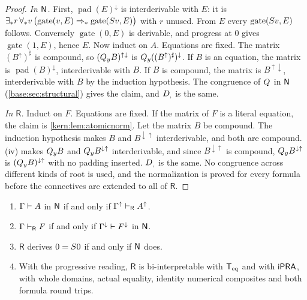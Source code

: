 \begin{proof}
\emph{In $\mathsf{N}$.}  First, $\operatorname{pad}(E)^{\downarrow}$ is
interderivable with $E$: it is
$\exists_* r\,\forall_* v\,\bigl(\operatorname{gate}(v,E)\Rightarrow_*
\operatorname{gate}(S v,E)\bigr)$ with $r$ unused.  From $E$ every
$\operatorname{gate}(S v,E)$ follows.  Conversely
$\operatorname{gate}(0,E)$ is derivable, and progress at $0$ gives
$\operatorname{gate}(1,E)$, hence $E$.  Now induct on $A$.  Equations are
fixed.  The matrix $(B^{\uparrow})^{\sharp}$ is compound, so
$(Q_{y}B)^{\uparrow\downarrow}$ is $Q_{y}((B^{\uparrow})^{\sharp})^{\downarrow}$.
If $B$ is an equation, the matrix is $\operatorname{pad}(B)^{\downarrow}$,
interderivable with $B$.  If $B$ is compound, the matrix is
$B^{\uparrow\downarrow}$, interderivable with $B$ by the induction
hypothesis.  The congruence of $Q_{}$ in $\mathsf{N}$
(\cref{base:sec:structural}) gives the claim, and $D_{,}$ is the same.

\emph{In $\mathsf{R}$.}  Induct on $F$.  Equations are fixed.  If the matrix
of $F$ is a literal equation, the claim is \cref{kern:lem:atomicnorm}.  Let
the matrix $B$ be compound.  The induction hypothesis makes $B$ and
$B^{\downarrow\uparrow}$ interderivable, and both are compound.
(iv) makes $Q_{y}B$ and
$Q_{y}B^{\downarrow\uparrow}$ interderivable, and since
$B^{\downarrow\uparrow}$ is compound, $Q_{y}B^{\downarrow\uparrow}$ is
$(Q_{y}B)^{\downarrow\uparrow}$ with no padding inserted.  $D_{,}$ is the
same.  No congruence across different kinds of root is used, and the
normalization is proved for every formula before the connectives are
extended to all of $\mathsf{R}$.
\end{proof}

\begin{theorem}
\label{kern:thm:uniform}
\begin{enumerate}[label=\textup{(\roman*)}]
\item $\Gamma\vdash A$ in $\mathsf{N}$ if and only if
 $\Gamma^{\uparrow}\vdash_{\mathsf{R}}A^{\uparrow}$.
\item $\Gamma\vdash_{\mathsf{R}}F$ if and only if
 $\Gamma^{\downarrow}\vdash F^{\downarrow}$ in $\mathsf{N}$.
\item $\mathsf{R}$ derives $0=S 0$ if and only if $\mathsf{N}$ does.
\item With the progressive reading, $\mathsf{R}$ is bi-interpretable with
 $\mathsf{T}_{\mathrm{eq}}$ and with $\mathsf{iPRA}$, with whole domains, actual equality, identity
 numerical composites and both formula round trips.
\end{enumerate}
\end{theorem}

